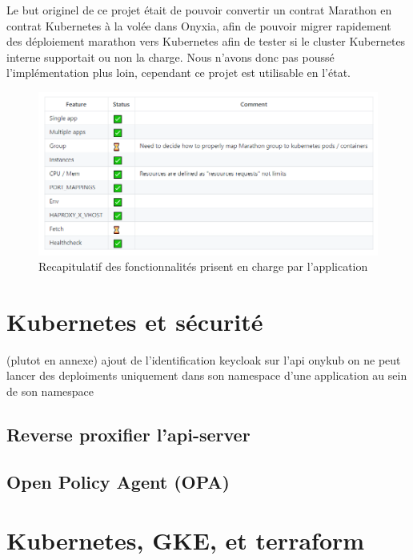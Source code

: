 \documentclass[11pt,fleqn]{book} %
\begin{document}
Le but originel de ce projet était de pouvoir convertir un contrat Marathon en contrat Kubernetes à la volée dans Onyxia, afin de pouvoir migrer rapidement des déploiement marathon vers Kubernetes afin de tester si le cluster Kubernetes interne supportait ou non la charge. Nous n'avons donc pas poussé l'implémentation plus loin, cependant ce projet est utilisable en l'état.
\begin{figure}[H]\centering
\renewcommand{\figurename}{Tableau}
\includegraphics[scale=0.6]{Pictures/CI-CD/marathon-to-kub.PNG}
\captionsetup{margin=1.5cm,format=hang,justification=justified}
\caption[]{Recapitulatif des fonctionnalités prisent en charge par l'application \newline}
\end{figure}




\chapter{Kubernetes et sécurité} 
\vspace{-2cm}
(plutot en annexe)
ajout de l'identification keycloak sur l'api
onykub on ne peut lancer des deploiments uniquement dans son namespace d'une application au sein de son namespace

\section*{Reverse proxifier l'api-server}

\section*{Open Policy Agent (OPA)}

\chapter{Kubernetes, GKE, et terraform}
\end{document}
